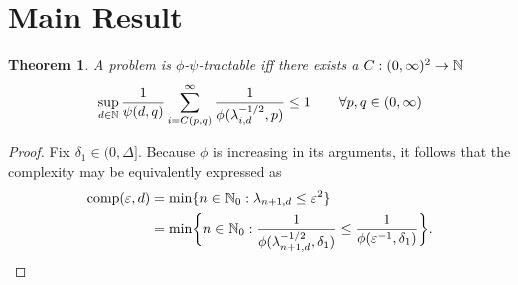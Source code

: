 \documentclass{article}
\newtheorem{theorem}{Theorem}
\theoremstyle{definition}
\begin{document}
\section{Main Result}
\begin{theorem} A problem is $\phi$-$\psi$-tractable iff there exists a  $C : (0,\infty)^2 \to \mathbb{N}$
\begin{equation} \label{eq:tractiff}
    \sup_{d \in \mathbb{N}} \frac{1}{\psi(d,q)} \sum_{i = C(p,q)}^\infty \frac{1}{\phi(\lambda_{i, d}^{-1/2},p)} \le 1 \qquad \forall p,q \in (0,\infty)
\end{equation}
\end{theorem}
\begin{proof}
Fix $\delta_1 \in (0,\Delta]$.  Because $\phi$ is increasing in its arguments, it follows that the complexity may be equivalently expressed as 
\begin{align*}
    \operatorname{comp}(\varepsilon, d) &= \min \{n \in \mathbb{N}_{0} : \lambda_{n+1, d} \le \varepsilon^2\} \\
    &= \min \biggl\{n \in \mathbb{N}_{0} : \frac{1}{\phi(\lambda_{n+1, d}^{-1/2},\delta_1)} \le \frac{1}{\phi(\varepsilon^{-1},\delta_1)} \biggr\}.
\end{align*}


\end{proof}
\end{document}
